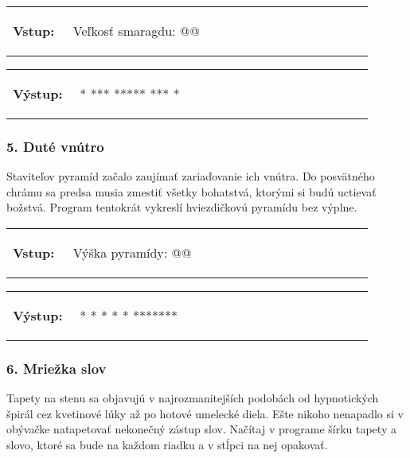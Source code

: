 \begin{tabular}{@{}p{0.15\linewidth}p{0.75\linewidth}}
\textbf{\small Vstup:} &
\vspace{-3em}
\begin{code}
Veľkosť smaragdu: @\fbox{5}@
\end{code}
\end{tabular}

\vspace{-2em}
\begin{tabular}{@{}p{0.15\linewidth}p{0.75\linewidth}}
\textbf{\small Výstup:} &
\vspace{-3em}
\begin{code}
  *
 ***
*****
 ***
  *
\end{code}
\end{tabular}
\vspace{-2em}

\subsubsection*{5. Duté vnútro}
Staviteľov pyramíd začalo zaujímať zariaďovanie ich vnútra. Do posvätného chrámu sa predsa musia zmestiť všetky bohatstvá, ktorými si budú uctievať božstvá. Program tentokrát vykreslí hviezdičkovú pyramídu bez výplne.

\begin{tabular}{@{}p{0.15\linewidth}p{0.75\linewidth}}
\textbf{\small Vstup:} &
\vspace{-3em}
\begin{code}
Výška pyramídy: @\fbox{4}@
\end{code}
\end{tabular}

\vspace{-2em}
\begin{tabular}{@{}p{0.15\linewidth}p{0.75\linewidth}}
\textbf{\small Výstup:} &
\vspace{-3em}
\begin{code}
   *
  * *
 *   *
*******
\end{code}
\end{tabular}
\vspace{-2em}


\subsubsection*{6. Mriežka slov}
Tapety na stenu sa objavujú v najrozmanitejších podobách od hypnotických špirál cez kvetinové lúky až po hotové umelecké diela. Ešte nikoho nenapadlo si v obývačke natapetovať nekonečný zástup slov. Načítaj v programe šírku tapety a slovo, ktoré sa bude na každom riadku a v stĺpci na nej opakovať.

